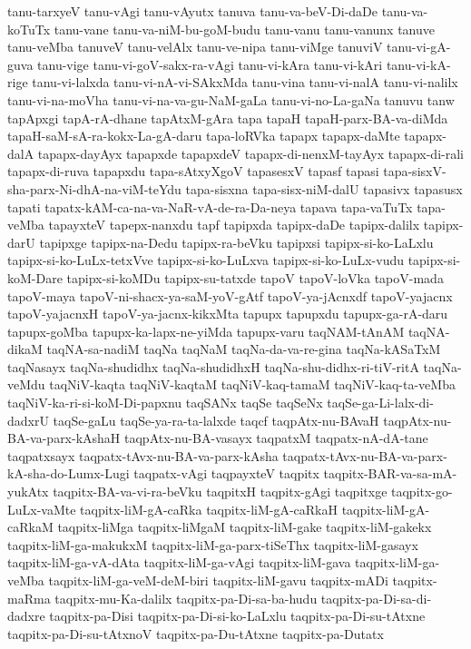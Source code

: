 {tanu-tarxyeV
tanu-vAgi
tanu-vAyutx
tanuva
tanu-va-beV-Di-daDe
tanu-va-koTuTx
tanu-vane
tanu-va-niM-bu-goM-budu
tanu-vanu
tanu-vanunx
tanuve
tanu-veMba
tanuveV
tanu-velAlx
tanu-ve-nipa
tanu-viMge
tanuviV
tanu-vi-gA-guva
tanu-vige
tanu-vi-goV-sakx-ra-vAgi
tanu-vi-kAra
tanu-vi-kAri
tanu-vi-kA-rige
tanu-vi-lalxda
tanu-vi-nA-vi-SAkxMda
tanu-vina
tanu-vi-nalA
tanu-vi-nalilx
tanu-vi-na-moVha
tanu-vi-na-va-gu-NaM-gaLa
tanu-vi-no-La-gaNa
tanuvu
tanw
tapApxgi
tapA-rA-dhane
tapAtxM-gAra
tapa
tapaH
tapaH-parx-BA-va-diMda
tapaH-saM-sA-ra-kokx-La-gA-daru
tapa-loRVka
tapapx
tapapx-daMte
tapapx-dalA
tapapx-dayAyx
tapapxde
tapapxdeV
tapapx-di-nenxM-tayAyx
tapapx-di-rali
tapapx-di-ruva
tapapxdu
tapa-sAtxyXgoV
tapasesxV
tapasf
tapasi
tapa-sisxV-sha-parx-Ni-dhA-na-viM-teYdu
tapa-sisxna
tapa-sisx-niM-dalU
tapasivx
tapasusx
tapati
tapatx-kAM-ca-na-va-NaR-vA-de-ra-Da-neya
tapava
tapa-vaTuTx
tapa-veMba
tapayxteV
tapepx-nanxdu
tapf
tapipxda
tapipx-daDe
tapipx-dalilx
tapipx-darU
tapipxge
tapipx-na-Dedu
tapipx-ra-beVku
tapipxsi
tapipx-si-ko-LaLxlu
tapipx-si-ko-LuLx-tetxVve
tapipx-si-ko-LuLxva
tapipx-si-ko-LuLx-vudu
tapipx-si-koM-Dare
tapipx-si-koMDu
tapipx-su-tatxde
tapoV
tapoV-loVka
tapoV-mada
tapoV-maya
tapoV-ni-shacx-ya-saM-yoV-gAtf
tapoV-ya-jAcnxdf
tapoV-yajacnx
tapoV-yajacnxH
tapoV-ya-jacnx-kikxMta
tapupx
tapupxdu
tapupx-ga-rA-daru
tapupx-goMba
tapupx-ka-lapx-ne-yiMda
tapupx-varu
taqNAM-tAnAM
taqNA-dikaM
taqNA-sa-nadiM
taqNa
taqNaM
taqNa-da-va-re-gina
taqNa-kASaTxM
taqNasayx
taqNa-shudidhx
taqNa-shudidhxH
taqNa-shu-didhx-ri-tiV-ritA
taqNa-veMdu
taqNiV-kaqta
taqNiV-kaqtaM
taqNiV-kaq-tamaM
taqNiV-kaq-ta-veMba
taqNiV-ka-ri-si-koM-Di-papxnu
taqSANx
taqSe
taqSeNx
taqSe-ga-Li-lalx-di-dadxrU
taqSe-gaLu
taqSe-ya-ra-ta-lalxde
taqcf
taqpAtx-nu-BAvaH
taqpAtx-nu-BA-va-parx-kAshaH
taqpAtx-nu-BA-vasayx
taqpatxM
taqpatx-nA-dA-tane
taqpatxsayx
taqpatx-tAvx-nu-BA-va-parx-kAsha
taqpatx-tAvx-nu-BA-va-parx-kA-sha-do-Lumx-Lugi
taqpatx-vAgi
taqpayxteV
taqpitx
taqpitx-BAR-va-sa-mA-yukAtx
taqpitx-BA-va-vi-ra-beVku
taqpitxH
taqpitx-gAgi
taqpitxge
taqpitx-go-LuLx-vaMte
taqpitx-liM-gA-caRka
taqpitx-liM-gA-caRkaH
taqpitx-liM-gA-caRkaM
taqpitx-liMga
taqpitx-liMgaM
taqpitx-liM-gake
taqpitx-liM-gakekx
taqpitx-liM-ga-makukxM
taqpitx-liM-ga-parx-tiSeThx
taqpitx-liM-gasayx
taqpitx-liM-ga-vA-dAta
taqpitx-liM-ga-vAgi
taqpitx-liM-gava
taqpitx-liM-ga-veMba
taqpitx-liM-ga-veM-deM-biri
taqpitx-liM-gavu
taqpitx-mADi
taqpitx-maRma
taqpitx-mu-Ka-dalilx
taqpitx-pa-Di-sa-ba-hudu
taqpitx-pa-Di-sa-di-dadxre
taqpitx-pa-Disi
taqpitx-pa-Di-si-ko-LaLxlu
taqpitx-pa-Di-su-tAtxne
taqpitx-pa-Di-su-tAtxnoV
taqpitx-pa-Du-tAtxne
taqpitx-pa-Dutatx
}
